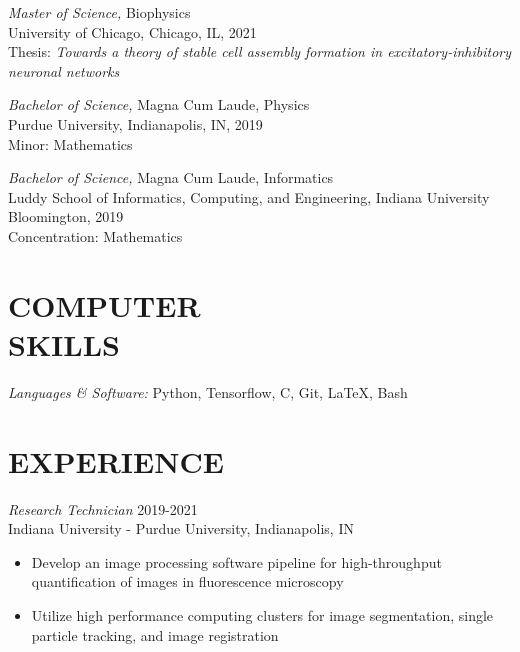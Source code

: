 \documentclass[margin, 10pt]{res} %
\begin{document}
\begin{resume}
{\sl Master of Science,} Biophysics\\
University of Chicago, Chicago, IL, 2021\\
Thesis: \textit{Towards a theory of stable cell assembly formation in excitatory-inhibitory neuronal networks}


{\sl Bachelor of Science,} Magna Cum Laude, Physics \\
Purdue University, Indianapolis, IN, 2019\\
Minor: Mathematics 

{\sl Bachelor of Science,} Magna Cum Laude, Informatics \\
Luddy School of Informatics, Computing, and Engineering, Indiana University Bloomington, 2019\\
Concentration: Mathematics 
 


\section{COMPUTER \\ SKILLS} 

{\sl Languages \& Software:} 
Python, Tensorflow, C, Git, LaTeX, Bash\\
 
 
\section{EXPERIENCE}

{\sl Research Technician} \hfill 2019-2021 \\
Indiana University - Purdue University, Indianapolis, IN

\begin{itemize} \itemsep -2pt %

\item Develop an image processing software pipeline for high-throughput quantification of images in fluorescence microscopy

\item Utilize high performance computing clusters for image segmentation, single particle tracking, and image registration
 

\end{itemize}
\end{resume}
\end{document}
